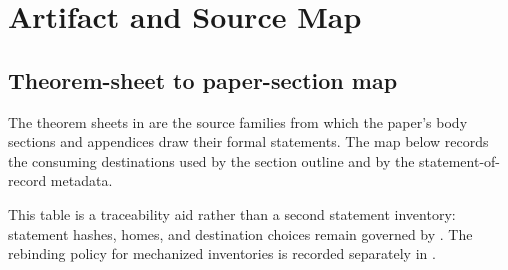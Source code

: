 \documentclass[11pt]{article}
\theoremstyle{definition}
\begin{document}
 \section{Artifact and Source Map}\label{app:artifact-map}

\subsection{Theorem-sheet to paper-section map}
\label{appsubsec:artifact-map-sheet-to-section}

The theorem sheets in  are the source families from
which the paper's body sections and appendices draw their formal statements.
The map below records the consuming destinations used by the section outline
and by the statement-of-record metadata.

This table is a traceability aid rather than a second statement inventory:
statement hashes, homes, and destination choices remain governed by
.  The rebinding policy for
mechanized inventories is recorded separately in
.
\end{document}
